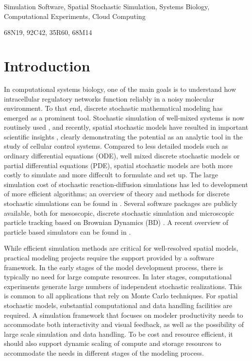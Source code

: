 \documentclass[final,leqno,onefignum,onetabnum]{siamltex1213}
\begin{document}
\begin{keywords}
Simulation Software, Spatial Stochastic Simulation, Systems Biology, Computational Experiments, Cloud Computing\end{keywords}
\begin{AMS}
68N19, 	92C42, 	35R60,  	68M14  	\end{AMS}


\section{Introduction}
\label{sec:Introduction}

In computational systems biology, one of the main goals is to understand how intracellular regulatory networks function reliably in a noisy molecular environment. To that end, discrete stochastic mathematical modeling has emerged as a prominent tool.   
Stochastic simulation of well-mixed systems is now routinely used \cite{10659837,12237400,12183631,16179466}, and recently, spatial stochastic models have resulted in important scientific insights \cite{FaEl, lawson2013,Sturrock2013}, clearly demonstrating the potential as an analytic tool in the study of cellular control systems. Compared to less detailed models such as ordinary differential equations (ODE), well mixed discrete stochastic models or partial differential equations (PDE), spatial stochastic models are both more costly to simulate and more diffecult to formulate and set up. The large simulation cost of stochastic reaction-diffusion simulations has led to development of more efficient algorithms; an overview of theory and methods for discrete stochastic simulations can be found in \cite{GillHellPetz}.
Several software packages are publicly available, both for mesoscopic, discrete stochastic simulation \cite{mesoRD, steps, urdme} and microscopic particle tracking based on Brownian Dynamics (BD) \cite{smoldyn, eGFRD, MCell, ReaDDy}.  A recent overview of particle based simulators can be found in \cite{ScoUllNoe:2014}. 


While efficient simulation methods are critical for well-resolved spatial models, practical modeling projects require the support provided by a software framework.  In the early stages of the model development process, 
there is typically no need for large compute resources. In later stages, 
computational experiments generate large numbers of independent stochastic realizations.
This is common to all applications that rely on Monte Carlo techniques. For spatial stochastic models, substantial computational and data handling facilities are required. A simulation framework that focuses on modeler productivity needs to accommodate both interactivity and visual feedback, as well as the possibility of large scale simulation and data handling. To be cost and resource efficient, it should also support dynamic scaling of compute and storage resources to accommodate the needs in different stages of the modeling process. 
\end{document}
